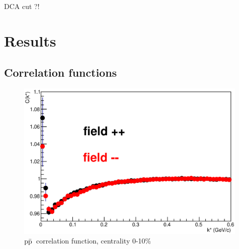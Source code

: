 \documentclass[ALICE,manyauthors]{ALICE_analysis_notes}
\newcommand{\pap}{$\rm p\bar{\rm p}$}
\newcommand{\pal}{$\rm p\bar{\rm \Lambda}$}
\newcommand{\apl}{$\bar{\rm p }\Lambda$}
\begin{document}



DCA cut ?!

\section{Results}

\subsection{Correlation functions}

\begin{figure}[h!]
   \centering
   \includegraphics[width=0.99\textwidth]{pics/compPAP}
   \caption{ \pap~correlation function, centrality 0-10$\%$}
   \label{fig:papCorrFun}
 \end{figure}
\end{document}

